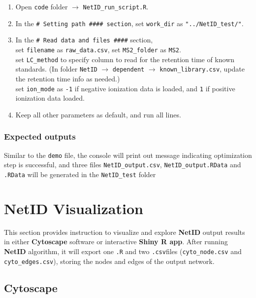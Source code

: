 \documentclass[]{article}
\begin{document}
\begin{enumerate}
\def\labelenumi{\arabic{enumi}.}
\item
  Open \texttt{code} folder \(\rightarrow\) \texttt{NetID\_run\_script.R}.
\item
  In the \texttt{\# Setting path \#\#\#\# section}, set \texttt{work\_dir} as \texttt{"../NetID\_test/"}.
\item
  In the \texttt{\# Read data and files \#\#\#\#} section,\\
  set \texttt{filename} as \texttt{raw\_data.csv}, set \texttt{MS2\_folder} as \texttt{MS2}.\\
  set \texttt{LC\_method} to specify column to read for the retention time of known standards. (In folder \texttt{NetID} \(\rightarrow\) \texttt{dependent} \(\rightarrow\) \texttt{known\_library.csv}, update the retention time info as needed.)\\
  set \texttt{ion\_mode} as \texttt{-1} if negative ionization data is loaded, and \texttt{1} if positive ionization data loaded.
\item
  Keep all other parameters as default, and run all lines.
\end{enumerate}

\hypertarget{expected-outputs-1}{%
\subsubsection{Expected outputs}\label{expected-outputs-1}}

Similar to the \texttt{demo} file, the console will print out message indicating optimization step is successful, and three files \texttt{NetID\_output.csv}, \texttt{NetID\_output.RData} and \texttt{.RData} will be generated in the \texttt{NetID\_test} folder

\hypertarget{netid-visualization}{%
\section{NetID Visualization}\label{netid-visualization}}

This section provides instruction to visualize and explore \textbf{NetID} output results in either \textbf{Cytoscape} software or interactive \textbf{Shiny R app}. After running \textbf{NetID} algorithm, it will export one \texttt{.R} and two \texttt{.csv}files (\texttt{cyto\_node.csv} and \texttt{cyto\_edges.csv}), storing the nodes and edges of the output network.

\hypertarget{cytoscape}{%
\subsection{Cytoscape}\label{cytoscape}}
\end{document}
